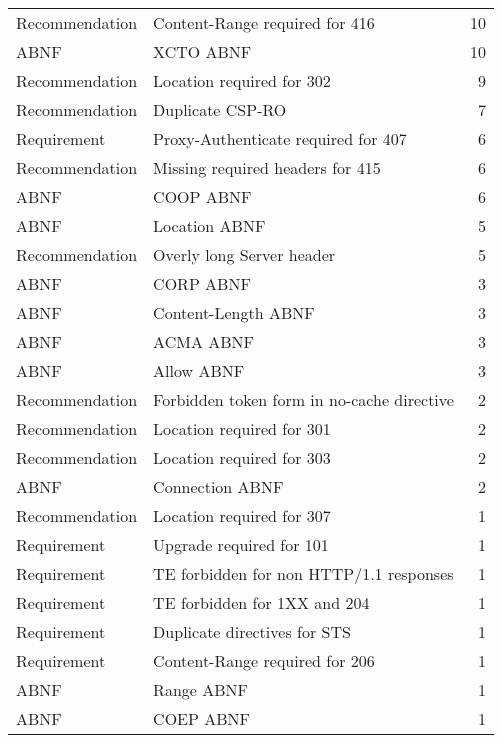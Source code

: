 \begin{tabular}{llr}
     Recommendation &              Content-Range required for 416 &       10 \\
               ABNF &                                   XCTO ABNF &       10 \\
     Recommendation &                   Location required for 302 &        9 \\
     Recommendation &                            Duplicate CSP-RO &        7 \\
        Requirement &         Proxy-Authenticate required for 407 &        6 \\
     Recommendation &            Missing required headers for 415 &        6 \\
               ABNF &                                   COOP ABNF &        6 \\
               ABNF &                               Location ABNF &        5 \\
     Recommendation &                   Overly long Server header &        5 \\
               ABNF &                                   CORP ABNF &        3 \\
               ABNF &                         Content-Length ABNF &        3 \\
               ABNF &                                   ACMA ABNF &        3 \\
               ABNF &                                  Allow ABNF &        3 \\
     Recommendation &  Forbidden token form in no-cache directive &        2 \\
     Recommendation &                   Location required for 301 &        2 \\
     Recommendation &                   Location required for 303 &        2 \\
               ABNF &                             Connection ABNF &        2 \\
     Recommendation &                   Location required for 307 &        1 \\
        Requirement &                    Upgrade required for 101 &        1 \\
        Requirement &     TE forbidden for non HTTP/1.1 responses &        1 \\
        Requirement &                TE forbidden for 1XX and 204 &        1 \\
        Requirement &                Duplicate directives for STS &        1 \\
        Requirement &              Content-Range required for 206 &        1 \\
               ABNF &                                  Range ABNF &        1 \\
               ABNF &                                   COEP ABNF &        1 \\
\bottomrule
\end{tabular}
